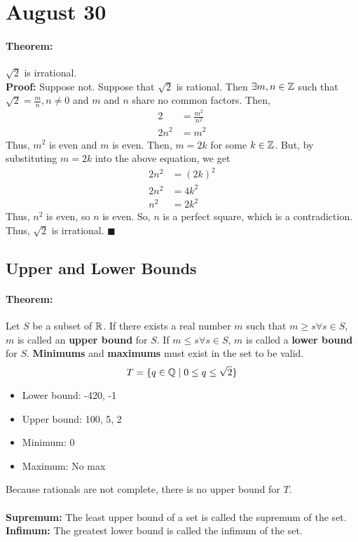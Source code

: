 \section{August 30}

\paragraph{Theorem:} $\sqrt{2}$ is irrational. \\
\textbf{Proof:} Suppose not. Suppose that $\sqrt{2}$ is rational. Then $\exists m, n \in \mathbb{Z}$ such that $\sqrt{2} = \frac{m}{n}, n \neq 0$ and $m$ and $n$ share no common factors. Then,
\begin{align*}
    2 &= \frac{m^2}{n^2} \\
    2n^2 &= m^2
\end{align*}
Thus, $m^2$ is even and $m$ is even. Then, $m = 2k$ for some $k \in \mathbb{Z}$. But, by substituting $m = 2k$ into the above equation, we get
\begin{align*}
    2n^2 &= (2k)^2 \\
    2n^2 &= 4k^2 \\
    n^2 &= 2k^2
\end{align*}
Thus, $n^2$ is even, so $n$ is even. So, $n$ is a perfect square, which is a contradiction. Thus, $\sqrt{2}$ is irrational. $\blacksquare$

\subsection{Upper and Lower Bounds}
\paragraph{Theorem:} Let $S$ be a subset of $\mathbb{R}$. If there exists a real number $m$ such that $m \geq s \forall s \in S$, $m$ is called an \textbf{upper bound} for $S$. If $m \leq s \forall s \in S$, $m$ is called a \textbf{lower bound} for $S$. \textbf{Minimums} and \textbf{maximums} must exist in the set to be valid.
$$T = \{q \in \mathbb{Q} \mid 0 \leq q \leq \sqrt{2}\}$$
\begin{itemize}
    \item Lower bound: -420, -1
    \item Upper bound: 100, 5, 2
    \item Minimum: 0
    \item Maximum: No max
\end{itemize}
Because rationals are not complete, there is no upper bound for $T$. \\\null\\
\textbf{Supremum:} The least upper bound of a set is called the supremum of the set. \\
\textbf{Infimum:} The greatest lower bound is called the infimum of the set.

